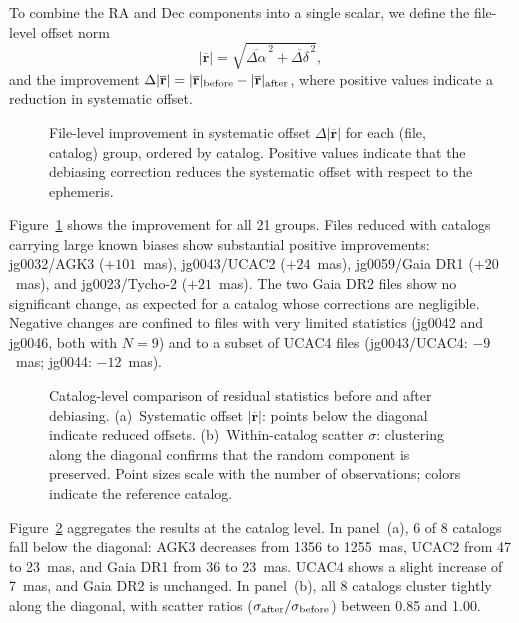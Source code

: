 \documentclass[linenumbers,amsmath,manuscript]{aastex702}
\begin{document}
To combine the RA and Dec components into a single scalar, we define the file-level offset norm
\begin{equation}
|\overline{\mathbf{r}}| = \sqrt{\overline{\Delta\alpha}^{\,2} + \overline{\Delta\delta}^{\,2}},
\end{equation}
and the improvement $\Delta|\overline{\mathbf{r}}| = |\overline{\mathbf{r}}|_{\rm before} - |\overline{\mathbf{r}}|_{\rm after}$, where positive values indicate a reduction in systematic offset.

\begin{figure}[ht!]
\caption{File-level improvement in systematic offset $\Delta|\overline{\mathbf{r}}|$ for each (file, catalog) group, ordered by catalog. Positive values indicate that the debiasing correction reduces the systematic offset with respect to the ephemeris.}
\label{fig:file_improvement_bars}
\end{figure}

Figure~\ref{fig:file_improvement_bars} shows the improvement for all 21 groups. Files reduced with catalogs carrying large known biases show substantial positive improvements: jg0032/AGK3 ($+101$~mas), jg0043/UCAC2 ($+24$~mas), jg0059/Gaia DR1 ($+20$~mas), and jg0023/Tycho-2 ($+21$~mas). The two Gaia DR2 files show no significant change, as expected for a catalog whose corrections are negligible. Negative changes are confined to files with very limited statistics (jg0042 and jg0046, both with $N=9$) and to a subset of UCAC4 files (jg0043/UCAC4: $-9$~mas; jg0044: $-12$~mas).

\begin{figure}[ht!]
\caption{Catalog-level comparison of residual statistics before and after debiasing. (a)~Systematic offset $|\overline{\mathbf{r}}|$: points below the diagonal indicate reduced offsets. (b)~Within-catalog scatter $\sigma$: clustering along the diagonal confirms that the random component is preserved. Point sizes scale with the number of observations; colors indicate the reference catalog.}
\label{fig:catalog_scatter}
\end{figure}

Figure~\ref{fig:catalog_scatter} aggregates the results at the catalog level. In panel~(a), 6 of 8 catalogs fall below the diagonal: AGK3 decreases from 1356 to 1255~mas, UCAC2 from 47 to 23~mas, and Gaia DR1 from 36 to 23~mas. UCAC4 shows a slight increase of 7~mas, and Gaia DR2 is unchanged. In panel~(b), all 8 catalogs cluster tightly along the diagonal, with scatter ratios ($\sigma_{\rm after}/\sigma_{\rm before}$) between 0.85 and 1.00.
\end{document}
